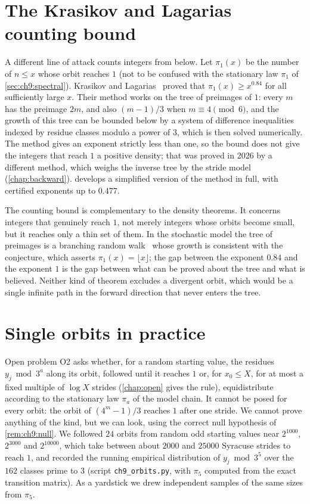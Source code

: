 \section{The Krasikov and Lagarias counting bound}\label{sec:ch9:krasikov}

A different line of attack counts integers from below. Let $\pi_1(x)$ be the
number of $n\le x$ whose orbit reaches $1$ (not to be confused with the stationary law $\pi_1$ of \cref{sec:ch9:spectral}). Krasikov and
Lagarias~\cite{krasikov2003} proved that $\pi_1(x)\geq x^{0.84}$ for all
sufficiently large $x$. Their method works on the tree of preimages of $1$:
every $m$ has the preimage $2m$, and also $(m-1)/3$ when $m\equiv4\pmod6$, and
the growth of this tree can be bounded below by a system of difference
inequalities indexed by residue classes modulo a power of $3$, which is then
solved numerically. The method gives an exponent strictly less than one, so the
bound does not give the integers that reach $1$ a positive density; that was proved in 2026 by a different method, which weighs the inverse tree by the stride model (\cref{chap:backward}).  develops a
simplified version of the method in full, with certified exponents up to
$0.477$.

The counting bound is complementary to the density theorems. It concerns
integers that genuinely reach $1$, not merely integers whose orbits become
small, but it reaches only a thin set of them. In the stochastic model the tree of
preimages is a branching random walk~\cite{lagarias1992} whose growth is
consistent with the conjecture, which asserts $\pi_1(x)=\lfloor x\rfloor$; the
gap between the exponent $0.84$ and the exponent $1$ is the gap between what
can be proved about the tree and what is believed. Neither kind of theorem excludes a divergent orbit, which would
be a single infinite path in the forward direction that never enters the tree.

\section{Single orbits in practice}\label{sec:ch9:single}

Open problem O2 asks whether, for a random starting value, the residues $y_j\bmod3^a$ along its orbit, followed until it reaches $1$ or, for $x_0\le X$, for at most a fixed multiple of $\log X$ strides (\cref{chap:open} gives the rule), equidistribute according to the stationary law $\pi_a$ of the model chain.
It cannot be posed for every orbit: the orbit of $(4^m-1)/3$ reaches $1$ after one stride.
We cannot prove anything of the kind, but we can look, using the correct
null hypothesis of \cref{rem:ch9:null}. We followed $24$ orbits from random odd
starting values near $2^{1000}$, $2^{3000}$ and $2^{10000}$, which take between about
$2000$ and $25000$ Syracuse strides to reach $1$, and recorded the running
empirical distribution of $y_j\bmod3^5$ over the $162$ classes prime to $3$
(script \texttt{ch9\_orbits.py}, with $\pi_5$ computed from the exact transition
matrix). As a yardstick we drew independent samples of the same sizes from
$\pi_5$.

